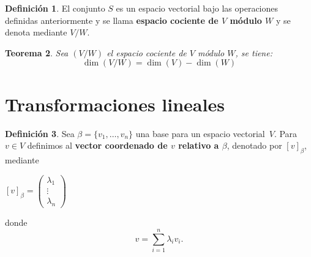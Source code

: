 \documentclass[12pt]{book}
\newtheorem{theorem}{Teorema}[section]
\theoremstyle{definition}
\newtheorem{definition}[theorem]{Definición}
\newcounter{in}
\newcounter{ini}
\begin{document}
\begin{definition}
  El conjunto $S$ es un espacio vectorial bajo las operaciones
  definidas anteriormente y se llama \textbf{espacio cociente de $V$ módulo $W$} y se denota mediante $V/W$. 
\end{definition}

\begin{theorem}
  \label{dim-esp-coc}
  Sea $(V/W)$ el espacio cociente de $V$ módulo $W$, se tiene:
  $$\dim(V/W)=\dim(V)-\dim(W)$$
\end{theorem}


\section{Transformaciones lineales}
\label{trasn-lin}

\begin{definition}
  \label{vec-coor}
  Sea $\beta=\{v_{1},\ldots,v_{n}\}$ una base para un espacio
  vectorial~$V$. Para $v\in V$ definimos al \textbf{vector coordenado de $v$
  relativo a $\beta$}, denotado por $[v]_{\beta}$, mediante
  \begin{center}
    $[v]_{\beta}=\begin{pmatrix}
      \lambda_{1}  \\
      \vdots  \\
      \lambda_{n}  
    \end{pmatrix}$
  \end{center}
donde
\begin{equation*}
  v=\sum^{n}_{i=1}\lambda_{i}v_{i}.
\end{equation*}
\end{definition}
\end{document}
